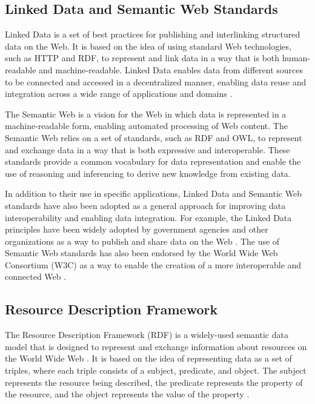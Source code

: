 \subsection{Linked Data and Semantic Web Standards}

Linked Data is a set of best practices for publishing and interlinking structured data on the Web.  It is based on the idea of using standard Web technologies, such as HTTP and RDF, to represent and link data in a way that is both human-readable and machine-readable.  Linked Data enables data from different sources to be connected and accessed in a decentralized manner, enabling data reuse and integration across a wide range of applications and domains \citep{bizer2011linked}.

The Semantic Web is a vision for the Web in which data is represented in a machine-readable form, enabling automated processing of Web content.  The Semantic Web relies on a set of standards, such as RDF and OWL, to represent and exchange data in a way that is both expressive and interoperable.  These standards provide a common vocabulary for data representation and enable the use of reasoning and inferencing to derive new knowledge from existing data.

In addition to their use in specific applications, Linked Data and Semantic Web standards have also been adopted as a general approach for improving data interoperability and enabling data integration.  For example, the Linked Data principles have been widely adopted by government agencies and other organizations as a way to publish and share data on the Web \citep{bizer2011linked}.  The use of Semantic Web standards has also been endorsed by the World Wide Web Consortium (W3C) as a way to enable the creation of a more interoperable and connected Web \citep{shadbolt2006semantic}.

\subsection{Resource Description Framework}
The Resource Description Framework (RDF) is a widely-used semantic data model that is designed to represent and exchange information about resources on the World Wide Web \citep{schreiber2014rdf}.  It is based on the idea of representing data as a set of triples, where each triple consists of a subject, predicate, and object.  The subject represents the resource being described, the predicate represents the property of the resource, and the object represents the value of the property \citep{schreiber2014rdf}.

